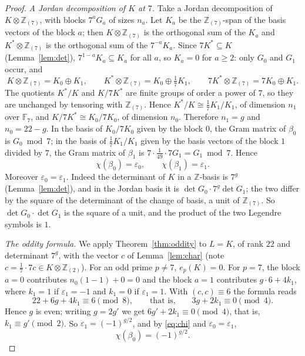 \documentclass[11pt,a4paper]{article}
\theoremstyle{definition}
\theoremstyle{remark}
\newcommand{\ZZ}{\mathbb{Z}}
\newcommand{\FF}{\mathbb{F}}
\begin{document}
\begin{proof}
\emph{A Jordan decomposition of $K$ at $7$.} Take a Jordan decomposition of $K\otimes\ZZ_{(7)}$, with blocks
$7^aG_a$ of sizes $n_a$. Let $K_a$ be the $\ZZ_{(7)}$-span of the basis vectors of the block $a$; then
$K\otimes\ZZ_{(7)}$ is the orthogonal sum of the $K_a$ and $K^*\otimes\ZZ_{(7)}$ is the orthogonal sum of the
$7^{-a}K_a$. Since $7K^*\subseteq K$ (Lemma~\ref{lem:det}), $7^{1-a}K_a\subseteq K_a$ for all $a$, so $K_a=0$ for
$a\ge2$: only $G_0$ and $G_1$ occur, and
\[
K\otimes\ZZ_{(7)}=K_0\oplus K_1,\qquad K^*\otimes\ZZ_{(7)}=K_0\oplus\tfrac17K_1,\qquad
7K^*\otimes\ZZ_{(7)}=7K_0\oplus K_1 .
\]
The quotients $K^*/K$ and $K/7K^*$ are finite groups of order a power of $7$, so they are unchanged by tensoring
with $\ZZ_{(7)}$. Hence $K^*/K\cong\frac17K_1/K_1$, of dimension $n_1$ over $\FF_7$, and $K/7K^*\cong K_0/7K_0$, of
dimension $n_0$. Therefore $n_1=g$ and $n_0=22-g$. In the basis of $K_0/7K_0$ given by the block $0$, the Gram matrix
of $\beta_0$ is $G_0\bmod7$; in the basis of $\frac17K_1/K_1$ given by the basis vectors of the block $1$ divided by
$7$, the Gram matrix of $\beta_1$ is $7\cdot\frac1{49}\cdot7G_1=G_1\bmod7$. Hence
\begin{equation}\label{eq:chi}
\chi(\beta_0)=\varepsilon_0,\qquad\chi(\beta_1)=\varepsilon_1 .
\end{equation}
Moreover $\varepsilon_0=\varepsilon_1$. Indeed the determinant of $K$ in a $\ZZ$-basis is $7^g$
(Lemma~\ref{lem:det}), and in the Jordan basis it is $\det G_0\cdot7^{g}\det G_1$; the two differ by the square of
the determinant of the change of basis, a unit of $\ZZ_{(7)}$. So $\det G_0\cdot\det G_1$ is the square of a unit,
and the product of the two Legendre symbols is $1$.

\emph{The oddity formula.} We apply Theorem~\ref{thm:oddity} to $L=K$, of rank $22$ and determinant $7^g$, with the
vector $c$ of Lemma~\ref{lem:char} (note $c=\frac17\cdot7c\in K\otimes\ZZ_{(2)}$). For an odd prime $p\ne7$,
$e_p(K)=0$. For $p=7$, the block $a=0$ contributes $n_0(1-1)+0=0$ and the block $a=1$ contributes
$g\cdot6+4k_1$, where $k_1=1$ if $\varepsilon_1=-1$ and $k_1=0$ if $\varepsilon_1=1$. With $(c,c)\equiv6$ the formula
reads
\[
22+6g+4k_1\equiv6\pmod8,\qquad\text{that is,}\qquad 3g+2k_1\equiv0\pmod4 .
\]
Hence $g$ is even; writing $g=2g'$ we get $6g'+2k_1\equiv0\pmod4$, that is, $k_1\equiv g'\pmod2$. So
$\varepsilon_1=(-1)^{g/2}$, and by \eqref{eq:chi} and $\varepsilon_0=\varepsilon_1$,
\[
\chi(\beta_0)=(-1)^{g/2}.
\]


\end{proof}
\end{document}
